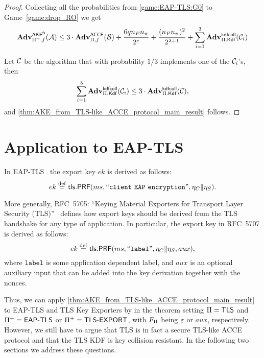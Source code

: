 \begin{proof}
Collecting all the probabilities from \cref{game:EAP-TLS:G0} to Game~\ref{game:drop_RO}
we get 
\begin{equation}
	\adv_{\protocolderived,f}^{\akefs}(\A)
		\leq 3 \cdot \adv_{\protocol,f}^{\acce}(\A[B])
		+ \frac{6 \unionbound}{2^{c}}
		+ \frac{(\numparties \numsessions)^2 }{2^{\noncelen+1}}
		+ \sum_{i=1}^{3} \adv_{\protocol.\mathsf{Kdf}}^{\kdfcoll}(\A[C]_i)
\end{equation}

Let $\A[C]$ be the algorithm that with probability $1 / 3$ implements one of the $\A[C]_i$'s,
then
\begin{equation}
	\sum_{i=1}^{3} \adv_{\protocol.\mathsf{Kdf}}^{\kdfcoll}(\A[C]_i) \leq 3 \cdot \adv_{\protocol.\mathsf{Kdf}}^{\kdfcoll}(\A[C]),
\end{equation}
and \cref{thm:AKE_from_TLS-like_ACCE_protocol_main_result} follows.
\end{proof}



\section{Application to EAP-TLS}\label{sec:EAP-TLS-security:application_EAP-TLS}


In EAP-TLS~\cite{IETF:RFC5216:EAP-TLS} the export key $ek$  is derived as follows:
\begin{equation}\label{eq:TLS-key-exporters:key_derivation}
	ek \defeq \mathsf{tls.PRF}(ms, ``\mathtt{client\ EAP\ encryption}", \nonce_{C} \concat \nonce_{S})  .
\end{equation}

More generally,
RFC~5705: ``Keying Material Exporters for Transport Layer Security (TLS)''~\cite{IETF:RFC5705:TLS-key-exporters}
defines how export keys should be derived from the TLS handshake for any type of application.
In particular,
the export key in RFC~5707 is derived as follows:
\begin{equation}
	ek \defeq \mathsf{tls.PRF}(ms, ``\mathtt{label}", \nonce_{C} \concat \nonce_{S}, aux) ,
\end{equation}
where $\mathtt{label}$ is some application dependent label,
and $aux$ is an optional auxiliary input that can be added into the key derivation together with the nonces.

Thus,
we can apply \cref{thm:AKE_from_TLS-like_ACCE_protocol_main_result} to EAP-TLS and TLS Key Exporters by in the theorem setting $\protocol = \mathsf{TLS}$ and  $\protocolderived = \operatorname{\mathsf{EAP-TLS}}$ or $\protocolderived = \operatorname{\mathsf{TLS-EXPORT}}$,
with $F_\protocol$ being $\emptystring$ or $aux$,
respectively. 
However,
we still have to argue that TLS is in fact a secure TLS-like ACCE protocol and that the TLS KDF is key collision resistant.
In the following two sections we address these questions.








